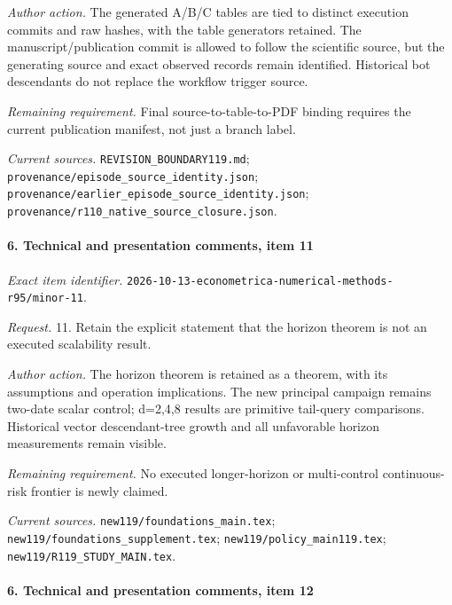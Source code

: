 \par\emph{Author action.} The generated A/\allowbreak{}B/\allowbreak{}C tables are tied to distinct execution commits and raw hashes, with the table generators retained. The manuscript/\allowbreak{}publication commit is allowed to follow the scientific source, but the generating source and exact observed records remain identified. Historical bot descendants do not replace the workflow trigger source.

\par\emph{Remaining requirement.} Final source-to-table-to-PDF binding requires the current publication manifest, not just a branch label.

\par\emph{Current sources.} \nolinkurl{REVISION_BOUNDARY119.md}; \nolinkurl{provenance/episode_source_identity.json}; \nolinkurl{provenance/earlier_episode_source_identity.json}; \nolinkurl{provenance/r110_native_source_closure.json}.

\paragraph{6. Technical and presentation comments, item 11}

\emph{Exact item identifier.} \nolinkurl{2026-10-13-econometrica-numerical-methods-r95/minor-11}.

\par\emph{Request.} 11. Retain the explicit statement that the horizon theorem is not an executed scalability result.

\par\emph{Author action.} The horizon theorem is retained as a theorem, with its assumptions and operation implications. The new principal campaign remains two-date scalar control; d=2,4,8 results are primitive tail-query comparisons. Historical vector descendant-tree growth and all unfavorable horizon measurements remain visible.

\par\emph{Remaining requirement.} No executed longer-horizon or multi-control continuous-risk frontier is newly claimed.

\par\emph{Current sources.} \nolinkurl{new119/foundations_main.tex}; \nolinkurl{new119/foundations_supplement.tex}; \nolinkurl{new119/policy_main119.tex}; \nolinkurl{new119/R119_STUDY_MAIN.tex}.

\paragraph{6. Technical and presentation comments, item 12}

